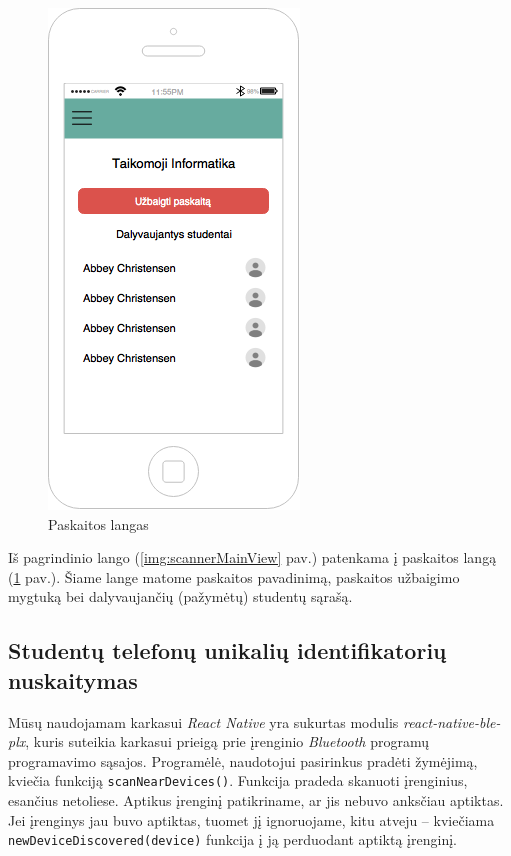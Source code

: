 \documentclass{VUMIFPSbakalaurinis}
\begin{document}
\begin{figure}[H]
	\centering
	\includegraphics[scale=0.5]{img/kursinio_app_dest_lecture}
	\caption{Paskaitos langas}
	\label{img:scannerLectureView}
\end{figure}

Iš pagrindinio lango (\ref{img:scannerMainView} pav.) patenkama į paskaitos langą (\ref{img:scannerLectureView} pav.). Šiame lange matome paskaitos pavadinimą, paskaitos užbaigimo mygtuką bei dalyvaujančių (pažymėtų) studentų sąrašą.

\subsection{Studentų telefonų unikalių identifikatorių nuskaitymas}

Mūsų naudojamam karkasui \textit{React Native} yra sukurtas modulis \textit{react-native-ble-plx}, kuris suteikia karkasui prieigą prie įrenginio \textit{Bluetooth} programų programavimo sąsajos. Programėlė, naudotojui pasirinkus pradėti žymėjimą, kviečia funkciją \verb|scanNearDevices()|. Funkcija pradeda skanuoti įrenginius, esančius netoliese. Aptikus įrenginį patikriname, ar jis nebuvo anksčiau aptiktas. Jei įrenginys jau buvo aptiktas, tuomet jį ignoruojame, kitu atveju – kviečiama \verb|newDeviceDiscovered(device)| funkcija į ją perduodant aptiktą įrenginį.
\end{document}
